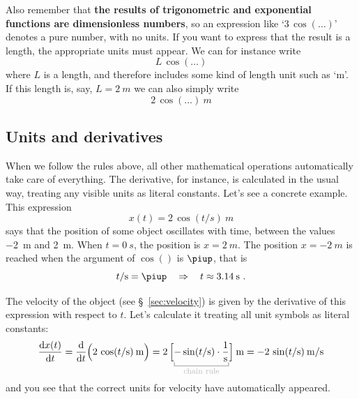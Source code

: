 \documentclass[a4paper,12pt,%
onecolumn,oneside,titlepage,%
british%
]{memoir}
\newcommand*{\pu}{\piup}%
\newcommand*{\di}{\mathrm{d}}%
\newcommand*{\limplies}{\mathbin{\Rightarrow}}%
\renewcommand*{\|}[1][]{\nonscript\:#1\vert\nonscript\:\mathopen{}}
\newcommand*{\sect}{\S}%
\newcommand*{\zerob}[1]{\makebox[0pt][c]{#1}}
\begin{document}
\smallskip

Also remember that \textbf{the results of trigonometric and exponential functions are dimensionless numbers}, so an expression like \enquote*{$3\,\cos(\dotso)$} denotes a pure number, with no units. If you want to express that the result is a length, the appropriate units must appear. We can for instance write
\begin{equation*}
  L\,\cos(\dotso)
\end{equation*}
where $L$ is a length, and therefore includes some kind of length unit such as \enquote*{\unit{m}}. If this length is, say, $L=\qty{2}{m}$ we can also simply write
\begin{equation*}
  2\,\cos(\dotso)\:\unit{m}
\end{equation*}

\subsection{Units and derivatives}
\label{sec:units_derivatives}

When we follow the rules above, all other mathematical operations automatically take care of everything. The derivative, for instance, is calculated in the usual way, treating any visible units as literal constants. Let's see a concrete example. This expression
\begin{equation*}
x(t) = 2\,\cos(t/\unit{s})\:\unit{m}
\end{equation*}
says that the position of some object oscillates with time, between the values \qty{-2}{m} and \qty{+2}{m}. When $t=\qty{0}{s}$, the position is $x=\qty{+2}{m}$. The position $x=\qty{-2}{m}$ is reached when the argument of $\cos()$ is $\pu$, that is
\begin{equation*}
  t/\unit{s} = \pu \quad\limplies\quad t\approx \qty{3.14}{s} \ .
\end{equation*}

The velocity of the object (see \sect~\ref{sec:velocity}) is given by the derivative of this expression with respect to $t$. Let's calculate it treating all unit symbols as literal constants:
\begin{equation*}
  \frac{\di x(t)}{\di t} = \frac{\di}{\di t}\Bigl(
  2\,\cos(t/\unit{s})\:\unit{m}
  \Bigr)
  =
  2\,\Bigl[
  \mathcolor{grey}{\underbracket{\color{black}-\sin(t/\unit{s})\cdot\frac{1}{\unit{s}}}_{\zerob{\color{grey}\footnotesize chain rule}}}
  \Bigr]\:\unit{m}
  =
 -2\,\sin(t/\unit{s})\:\unit{m/s}
\end{equation*}
and you see that the correct units for velocity have automatically appeared.
\end{document}
